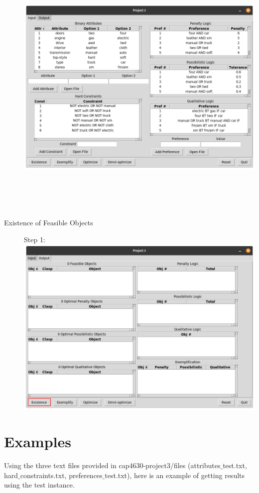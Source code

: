 \documentclass[11pt]{article}
\begin{document}
\begin{description}
\includegraphics[scale=0.3]{preferences_imported}\\\\\\\\\\


\item[Existence of Feasible Objects] Step 1:\\
\includegraphics[scale=0.3]{existence}
\end{description}

\section{Examples}
Using the three text files provided in cap4630-project3/files (attributes$\_$test.txt, hard$\_$constraints.txt, preferences$\_$test.txt), here is an example of getting results using the test instance.
\end{document}
